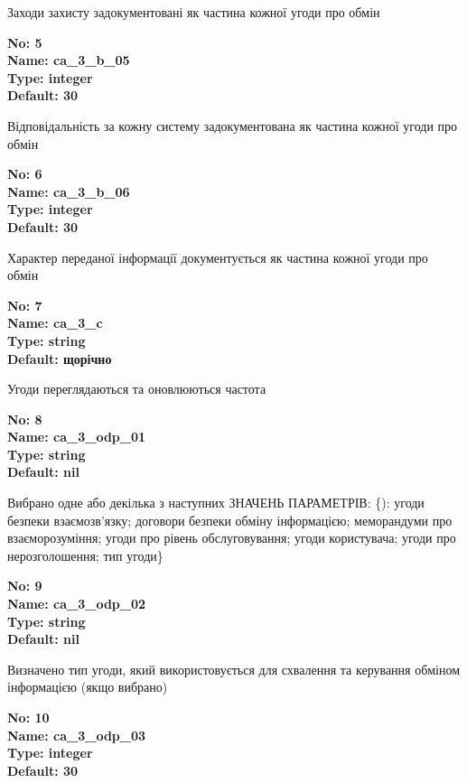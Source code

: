 \documentclass{article}
\begin{document}
{\footnotesize Заходи захисту задокументовані як частина кожної угоди про обмін}


{\footnotesize\bfseries
No: 5\\
Name: ca\_\allowbreak{}3\_\allowbreak{}b\_\allowbreak{}05\\
Type: integer\\
Default: 30
}

{\footnotesize Відповідальність за кожну систему задокументована як частина кожної угоди про обмін}


{\footnotesize\bfseries
No: 6\\
Name: ca\_\allowbreak{}3\_\allowbreak{}b\_\allowbreak{}06\\
Type: integer\\
Default: 30
}

{\footnotesize Характер переданої інформації документується як частина кожної угоди про обмін}


{\footnotesize\bfseries
No: 7\\
Name: ca\_\allowbreak{}3\_\allowbreak{}c\\
Type: string\\
Default: \textquotedbl{}щорічно\textquotedbl{}
}

{\footnotesize Угоди переглядаються та оновлюються частота}


{\footnotesize\bfseries
No: 8\\
Name: ca\_\allowbreak{}3\_\allowbreak{}odp\_\allowbreak{}01\\
Type: string\\
Default: nil
}

{\footnotesize Вибрано одне або декілька з наступних ЗНАЧЕНЬ ПАРАМЕТРІВ: \{): угоди безпеки взаємозв'язку; договори безпеки обміну інформацією; меморандуми про взаєморозуміння; угоди про рівень обслуговування; угоди користувача; угоди про нерозголошення; тип угоди\}}


{\footnotesize\bfseries
No: 9\\
Name: ca\_\allowbreak{}3\_\allowbreak{}odp\_\allowbreak{}02\\
Type: string\\
Default: nil
}

{\footnotesize Визначено тип угоди, який використовується для схвалення та керування обміном інформацією (якщо вибрано)}


{\footnotesize\bfseries
No: 10\\
Name: ca\_\allowbreak{}3\_\allowbreak{}odp\_\allowbreak{}03\\
Type: integer\\
Default: 30
}
\end{document}
